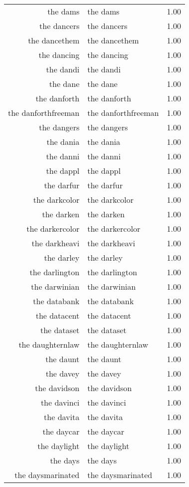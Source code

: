 \begin{table}[ht]
\begin{tabular}{rlr}
  the dams & the dams & 1.00 \\ 
  the dancers & the dancers & 1.00 \\ 
  the dancethem & the dancethem & 1.00 \\ 
  the dancing & the dancing & 1.00 \\ 
  the dandi & the dandi & 1.00 \\ 
  the dane & the dane & 1.00 \\ 
  the danforth & the danforth & 1.00 \\ 
  the danforthfreeman & the danforthfreeman & 1.00 \\ 
  the dangers & the dangers & 1.00 \\ 
  the dania & the dania & 1.00 \\ 
  the danni & the danni & 1.00 \\ 
  the dappl & the dappl & 1.00 \\ 
  the darfur & the darfur & 1.00 \\ 
  the darkcolor & the darkcolor & 1.00 \\ 
  the darken & the darken & 1.00 \\ 
  the darkercolor & the darkercolor & 1.00 \\ 
  the darkheavi & the darkheavi & 1.00 \\ 
  the darley & the darley & 1.00 \\ 
  the darlington & the darlington & 1.00 \\ 
  the darwinian & the darwinian & 1.00 \\ 
  the databank & the databank & 1.00 \\ 
  the datacent & the datacent & 1.00 \\ 
  the dataset & the dataset & 1.00 \\ 
  the daughternlaw & the daughternlaw & 1.00 \\ 
  the daunt & the daunt & 1.00 \\ 
  the davey & the davey & 1.00 \\ 
  the davidson & the davidson & 1.00 \\ 
  the davinci & the davinci & 1.00 \\ 
  the davita & the davita & 1.00 \\ 
  the daycar & the daycar & 1.00 \\ 
  the daylight & the daylight & 1.00 \\ 
  the days & the days & 1.00 \\ 
  the daysmarinated & the daysmarinated & 1.00 \\ 

\end{tabular}
\end{table}
